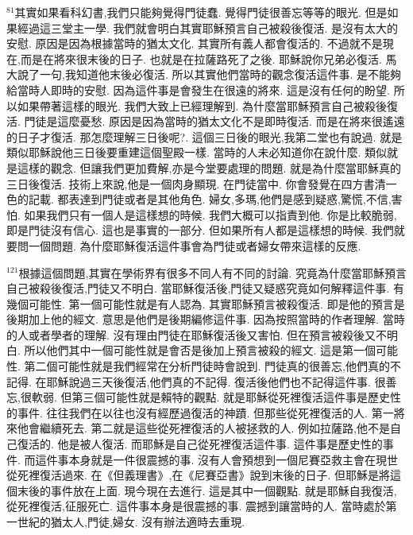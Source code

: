 \documentclass{book}
\begin{document}
$^{81}$其實如果看科幻書,我們只能夠覺得門徒蠢.
覺得門徒很善忘等等的眼光.
但是如果經過這三堂主一學.
我們就會明白其實耶穌預言自己被殺後復活.
是沒有太大的安慰.
原因是因為根據當時的猶太文化.
其實所有義人都會復活的.
不過就不是現在,而是在將來很末後的日子.
也就是在拉薩路死了之後.
耶穌說你兄弟必復活.
馬大說了一句,我知道他末後必復活.
所以其實他們當時的觀念復活這件事.
是不能夠給當時人即時的安慰.
因為這件事是會發生在很遠的將來.
這是沒有任何的盼望.
所以如果帶著這樣的眼光.
我們大致上已經理解到.
為什麼當耶穌預言自己被殺後復活.
門徒是這麼憂愁.
原因是因為當時的猶太文化不是即時復活.
而是在將來很遙遠的日子才復活.
那怎麼理解三日後呢?.
這個三日後的眼光,我第二堂也有說過.
就是類似耶穌說他三日後要重建這個聖殿一樣.
當時的人未必知道你在說什麼.
類似就是這樣的觀念.
但讓我們更加費解,亦是今堂要處理的問題.
就是為什麼當耶穌真的三日後復活.
技術上來說,他是一個肉身顯現.
在門徒當中.
你會發覺在四方書清一色的記載.
都表達到門徒或者是其他角色.
婦女,多瑪,他們是感到疑惑,驚慌,不信,害怕.
如果我們只有一個人是這樣想的時候.
我們大概可以指責到他.
你是比較脆弱,即是門徒沒有信心.
這也是事實的一部分.
但如果所有人都是這樣想的時候.
我們就要問一個問題.
為什麼耶穌復活這件事會為門徒或者婦女帶來這樣的反應.

$^{121}$根據這個問題,其實在學術界有很多不同人有不同的討論.
究竟為什麼當耶穌預言自己被殺後復活,門徒又不明白.
當耶穌復活後,門徒又疑惑究竟如何解釋這件事.
有幾個可能性.
第一個可能性就是有人認為.
其實耶穌預言被殺復活.
即是他的預言是後期加上他的經文.
意思是他們是後期編修這件事.
因為按照當時的作者理解.
當時的人或者學者的理解.
沒有理由門徒在耶穌復活後又害怕.
但在預言被殺後又不明白.
所以他們其中一個可能性就是會否是後加上預言被殺的經文.
這是第一個可能性.
第二個可能性就是我們經常在分析門徒時會說到.
門徒真的很善忘,他們真的不記得.
在耶穌說過三天後復活,他們真的不記得.
復活後他們也不記得這件事.
很善忘,很軟弱.
但第三個可能性就是賴特的觀點.
就是耶穌從死裡復活這件事是歷史性的事件.
往往我們在以往也沒有經歷過復活的神蹟.
但那些從死裡復活的人.
第一將來他會繼續死去.
第二就是這些從死裡復活的人被拯救的人.
例如拉薩路,他不是自己復活的.
他是被人復活.
而耶穌是自己從死裡復活這件事.
這件事是歷史性的事件.
而這件事本身就是一件很震撼的事.
沒有人會預想到一個尼賽亞救主會在現世從死裡復活過來.
在《但義理書》,在《尼賽亞書》說到末後的日子.
但耶穌是將這個末後的事件放在上面.
現今現在去進行.
這是其中一個觀點.
就是耶穌自我復活,從死裡復活,征服死亡.
這件事本身是很震撼的事.
震撼到讓當時的人.
當時處於第一世紀的猶太人,門徒,婦女.
沒有辦法適時去重現.
\end{document}
